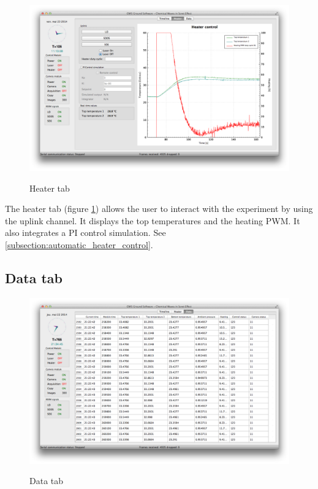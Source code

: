 \documentclass[11pt,a4paper,oneside]{report}
\begin{document}
\begin{figure}[!h]
\center
\includegraphics[width=15cm]{images/gs_heater_tab.png}
\label{image:gs_heater_tab}
\caption{Heater tab}
\end{figure}

The heater tab (figure \ref{image:gs_heater_tab}) allows the user to interact with the experiment by using the uplink channel.
It displays the top temperatures and the heating PWM.
It also integrates a PI control simulation.
See \ref{subsection:automatic_heater_control}.

\subsection{Data tab}

\begin{figure}[!h]
\center
\includegraphics[width=15cm]{images/gs_data_tab.png}
\label{image:gs_data_tab}
\caption{Data tab}
\end{figure}
\end{document}
